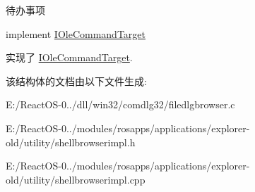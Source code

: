 \begin{DoxyRefDesc}{待办事项}
\item[\hyperlink{todo__todo000080}{待办事项}]implement \hyperlink{interface_i_ole_command_target}{I\+Ole\+Command\+Target} \end{DoxyRefDesc}


实现了 \hyperlink{interface_i_ole_command_target}{I\+Ole\+Command\+Target}.



该结构体的文档由以下文件生成\+:\begin{DoxyCompactItemize}
\item 
E\+:/\+React\+O\+S-\/0../dll/win32/comdlg32/filedlgbrowser.\+c\item 
E\+:/\+React\+O\+S-\/0../modules/rosapps/applications/explorer-\/old/utility/shellbrowserimpl.\+h\item 
E\+:/\+React\+O\+S-\/0../modules/rosapps/applications/explorer-\/old/utility/shellbrowserimpl.\+cpp\end{DoxyCompactItemize}
